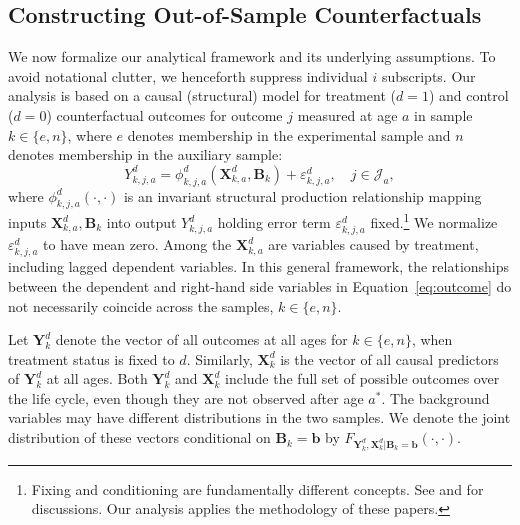 \subsection{Constructing Out-of-Sample Counterfactuals}\label{section:just}

We now formalize our analytical framework and its underlying assumptions. To avoid notational clutter, we henceforth suppress individual $i$ subscripts. Our analysis is based on a causal (structural) model for treatment ($d=1$) and control ($d=0$) counterfactual outcomes for outcome $j$ measured at age $a$ in sample $k \in \{e,n\}$, where $e$ denotes membership in the experimental sample and $n$ denotes membership in the auxiliary sample:
\begin{equation}\label{eq:outcome}
Y^d_{k,j,a} = \phi^d_{k,j,a} (\bm{X}^d_{k,a}, \bm{B}_k) + \varepsilon^d_{k,j,a}, \quad j \in \mathcal{J}_a,
\end{equation}
where $\phi^d_{k,j,a}\left( \cdot, \cdot \right)$ is an invariant structural production relationship mapping inputs $\bm{X}^d_{k,a}, \bm{B}_k$ into output $Y^d_{k,j,a}$ holding error term $\varepsilon^d_{k,j,a}$ fixed.\footnote{Fixing and conditioning are fundamentally different concepts. See \cite{Haavelmo_1943_Econometrica} and \citet{Heckman_Pinto_2015_EconometTheory} for discussions. Our analysis applies the methodology of these papers.} We normalize $\varepsilon^d_{k,j,a}$ to have mean zero. Among the $\bm{X}^d_{k,a}$ are variables caused by treatment, including lagged dependent variables. In this general framework, the relationships between the dependent and right-hand side variables in Equation~\eqref{eq:outcome} do not necessarily coincide across the samples, $k \in \{e,n\}$.

Let $\bm{Y}_k^d$ denote the vector of all outcomes at all ages for $k \in \{e, n \}$, when treatment status is fixed to $d$. Similarly, $\bm{X}_k^d$ is the vector of all causal predictors of $\bm{Y}_k^d$ at all ages. Both $\bm{Y}_k^d$ and $\bm{X}_k^d$ include the full set of possible outcomes over the life cycle, even though they are not observed after age $a^*$. The background variables may have different distributions in the two samples. We denote the joint distribution of these vectors conditional on $\bm{B}_k = \bm{b}$ by $F_{\bm{Y}_k^d, \bm{X}_k^d | \bm{B}_k = \bm{b}}(\cdot,\cdot)$.

